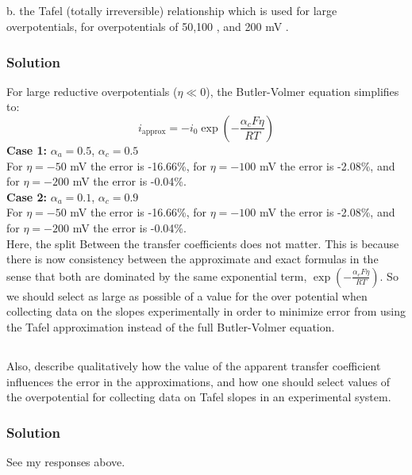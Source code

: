 \documentclass[12pt]{article}
\begin{document}
\subsection{}

b. the Tafel (totally irreversible) relationship which is used for large overpotentials, for overpotentials of 50,100 , and 200 mV .
\subsubsection{Solution}
For large reductive overpotentials ($\eta \ll 0$), the Butler-Volmer equation simplifies to:
\begin{equation}
i_\text{approx} = -i_0 \exp \left( -\frac{\alpha_c F \eta}{RT} \right)
\end{equation}
\textbf{Case 1:} $\alpha_a = 0.5$, $\alpha_c = 0.5$\\
For $\eta = -50$ mV the error is -16.66\%, for $\eta = -100$ mV the error is -2.08\%, and for $\eta = -200$ mV the error is -0.04\%.\\
\textbf{Case 2:} $\alpha_a = 0.1$, $\alpha_c = 0.9$\\
For $\eta = -50$ mV the error is -16.66\%, for $\eta = -100$ mV the error is -2.08\%, and for $\eta = -200$ mV the error is -0.04\%.\\
Here, the split Between the transfer coefficients does not matter. This is because there is now consistency between the approximate and exact formulas in the sense that both are dominated by the same exponential term, $\exp \left( -\frac{\alpha_c F \eta}{RT} \right)$. So we should select as large as possible of a value for the over potential when collecting data on the slopes experimentally in order to minimize error from using the Tafel approximation instead of the full Butler-Volmer equation.\\

\subsection{}
Also, describe qualitatively how the value of the apparent transfer coefficient influences the error in the approximations, and how one should select values of the overpotential for collecting data on Tafel slopes in an experimental system.
\subsubsection{Solution}
See my responses above.
\end{document}
